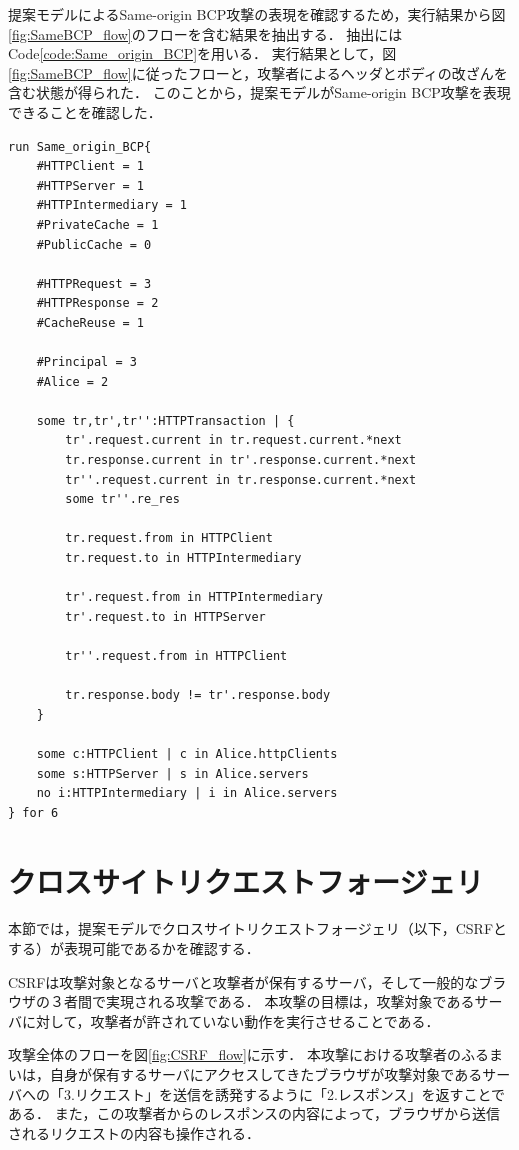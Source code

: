 \documentclass[12pt,a4paper]{jbook}
\begin{document}
提案モデルによるSame-origin BCP攻撃の表現を確認するため，実行結果から図\ref{fig:SameBCP_flow}のフローを含む結果を抽出する．
抽出にはCode\ref{code:Same_origin_BCP}を用いる．
実行結果として，図\ref{fig:SameBCP_flow}に従ったフローと，攻撃者によるヘッダとボディの改ざんを含む状態が得られた．
このことから，提案モデルがSame-origin BCP攻撃を表現できることを確認した．

\begin{lstlisting}[caption=Same-origin BCP攻撃の表現, label=code:Same_origin_BCP]
run Same_origin_BCP{
	#HTTPClient = 1
	#HTTPServer = 1
	#HTTPIntermediary = 1
	#PrivateCache = 1
	#PublicCache = 0

	#HTTPRequest = 3
	#HTTPResponse = 2
	#CacheReuse = 1

	#Principal = 3
	#Alice = 2

	some tr,tr',tr'':HTTPTransaction | {
		tr'.request.current in tr.request.current.*next
		tr.response.current in tr'.response.current.*next
		tr''.request.current in tr.response.current.*next
		some tr''.re_res

		tr.request.from in HTTPClient
		tr.request.to in HTTPIntermediary

		tr'.request.from in HTTPIntermediary
		tr'.request.to in HTTPServer

		tr''.request.from in HTTPClient

		tr.response.body != tr'.response.body
	}

	some c:HTTPClient | c in Alice.httpClients
	some s:HTTPServer | s in Alice.servers
	no i:HTTPIntermediary | i in Alice.servers
} for 6
\end{lstlisting}

\section{クロスサイトリクエストフォージェリ}
本節では，提案モデルでクロスサイトリクエストフォージェリ\cite{cookie-model}（以下，CSRFとする）が表現可能であるかを確認する．

CSRFは攻撃対象となるサーバと攻撃者が保有するサーバ，そして一般的なブラウザの３者間で実現される攻撃である．
本攻撃の目標は，攻撃対象であるサーバに対して，攻撃者が許されていない動作を実行させることである．

攻撃全体のフローを図\ref{fig:CSRF_flow}に示す．
本攻撃における攻撃者のふるまいは，自身が保有するサーバにアクセスしてきたブラウザが攻撃対象であるサーバへの「3.リクエスト」を送信を誘発するように「2.レスポンス」を返すことである．
また，この攻撃者からのレスポンスの内容によって，ブラウザから送信されるリクエストの内容も操作される．
\end{document}
